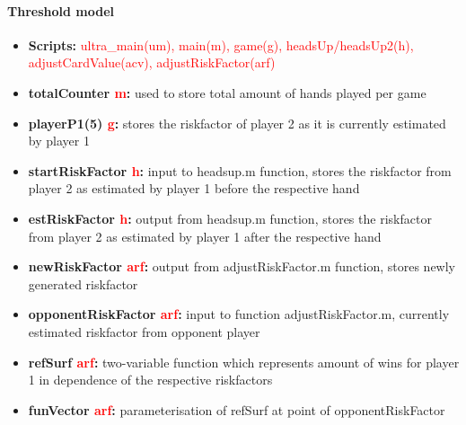 \documentclass[11pt]{article}
\begin{document}
\paragraph{Threshold model}
\begin{itemize}
\item	\textbf{Scripts:} \textcolor{red}{ultra\_main(um), main(m), game(g), headsUp/headsUp2(h), adjustCardValue(acv), adjustRiskFactor(arf)} \\

\item	\textbf{totalCounter \textcolor{red}{m}:} used to store total amount of hands played per game  \\

\item	\textbf{playerP1(5) \textcolor{red}{g}:} stores the riskfactor of player 2 as it is currently estimated by player 1  \\

\item	\textbf{startRiskFactor \textcolor{red}{h}:} input to headsup.m function, stores the riskfactor from player 2 as estimated by player 1 before the respective hand  \\

\item	\textbf{estRiskFactor \textcolor{red}{h}:} output from headsup.m function, stores the riskfactor from player 2 as estimated by player 1 after the respective hand   \\

\item	\textbf{newRiskFactor \textcolor{red}{arf}:}  output from adjustRiskFactor.m function, stores newly generated riskfactor\\

\item	\textbf{opponentRiskFactor \textcolor{red}{arf}:} input to function adjustRiskFactor.m, currently estimated riskfactor from opponent player \\

\item	\textbf{refSurf \textcolor{red}{arf}:} two-variable function which represents amount of wins for player 1 in dependence of the respective riskfactors \\

\item	\textbf{funVector \textcolor{red}{arf}:} parameterisation of refSurf at point of opponentRiskFactor \\

\end{itemize}
\end{document}
